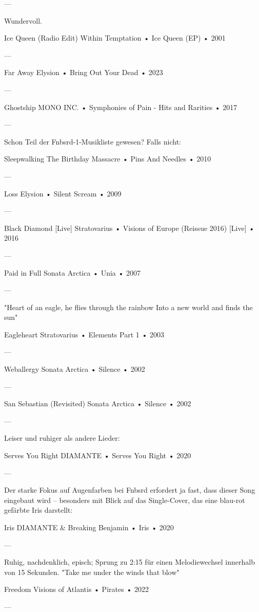 —

Wundervoll.

Ice Queen (Radio Edit)
Within Temptation
 •
Ice Queen (EP)
 •
2001


—

Far Away
Elysion
 •
Bring Out Your Dead
 •
2023


—

Ghostship
MONO INC.
 •
Symphonies of Pain - Hits and Rarities
 •
2017


—

Schon Teil der Fnbsrd-1-Musikliste gewesen? Falls nicht:

Sleepwalking
The Birthday Massacre
 •
Pins And Needles
 •
2010

—

Loss
Elysion
 •
Silent Scream
 •
2009


—

Black Diamond [Live]
Stratovarius
 •
Visions of Europe (Reissue 2016) [Live]
 •
2016


—

Paid in Full
Sonata Arctica
 •
Unia
 •
2007


—

"Heart of an eagle, he flies through the rainbow
Into a new world and finds the sun"

Eagleheart
Stratovarius
 •
Elements Part 1
 •
2003

—

Weballergy
Sonata Arctica
 •
Silence
 •
2002

—

San Sebastian (Revisited)
Sonata Arctica
 •
Silence
 •
2002


—

Leiser und ruhiger als andere Lieder:

Serves You Right
DIAMANTE
 •
Serves You Right
 •
2020


—

Der starke Fokus auf Augenfarben bei Fnbsrd erfordert ja fast, dass dieser Song eingebaut wird – besonders mit Blick auf das Single-Cover, das eine blau-rot gefärbte Iris darstellt:

Iris
DIAMANTE
 &
Breaking Benjamin
 •
Iris
 •
2020


—

Ruhig, nachdenklich, episch; Sprung zu 2:15 für einen Melodiewechsel innerhalb von 15 Sekunden.
"Take me under the winds that blow"

Freedom
Visions of Atlantis
 •
Pirates
 •
2022


—

